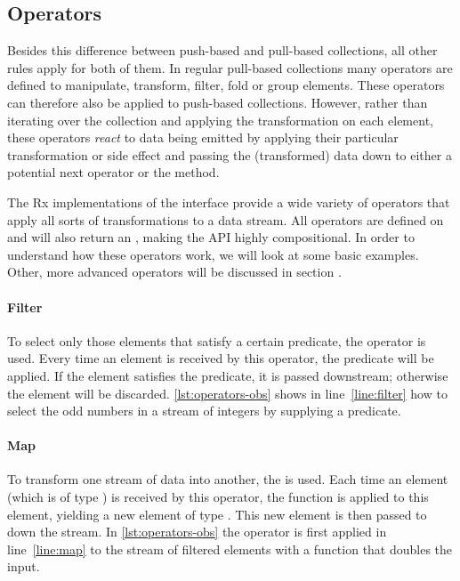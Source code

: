 \subsection{Operators}
\label{subsec:operators}
Besides this difference between push-based and pull-based collections, all other rules apply for both of them. In regular pull-based collections many operators are defined to manipulate, transform, filter, fold or group elements. These operators can therefore also be applied to push-based collections. However, rather than iterating over the collection and applying the transformation on each element, these operators \emph{react} to data being emitted by applying their particular transformation or side effect and passing the (transformed) data down to either a potential next operator or the  method.

The Rx implementations of the \obs interface provide a wide variety of operators that apply all sorts of transformations to a data stream. All operators are defined on \obs and will also return an \obs, making the API highly compositional. In order to understand how these operators work, we will look at some basic examples. Other, more advanced operators will be discussed in section .

\paragraph{Filter}To select only those elements that satisfy a certain predicate, the operator  is used. Every time an element is received by this operator, the predicate  will be applied. If the element satisfies the predicate, it is passed downstream; otherwise the element will be discarded. \autoref{lst:operators-obs} shows in line~\ref{line:filter} how to select the odd numbers in a stream of integers by supplying a predicate.

\paragraph{Map}To transform one stream of data into another, the  is used. Each time an element (which is of type ) is received by this operator, the function  is applied to this element, yielding a new element of type . This new element is then passed to down the stream. In \autoref{lst:operators-obs} the  operator is first applied in line~\ref{line:map} to the stream of filtered elements with a function that doubles the input.

